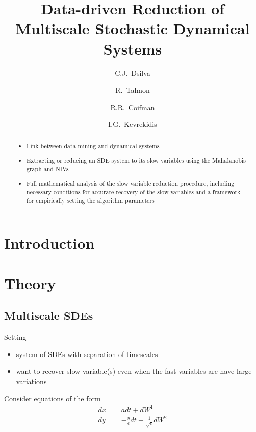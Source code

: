 \documentclass[1p]{elsarticle}
\title{Data-driven Reduction of Multiscale Stochastic Dynamical Systems }
\author[PrincetonCBE]{C.J.~Dsilva}
\author[YaleMath]{R.~Talmon}
\author[YaleMath]{R.R.~Coifman}
\author[PrincetonCBE, PrincetonPACM]{I.G.~Kevrekidis\corref{cor1}}
\begin{document}
\begin{abstract}

\begin{itemize}

\item Link between data mining and dynamical systems

\item Extracting or reducing an SDE system to its slow variables using the Mahalanobis graph and NIVs

\item Full mathematical analysis of the slow variable reduction procedure, including necessary conditions for accurate recovery of the slow variables and a framework for empirically setting the algorithm parameters

\end{itemize}

\end{abstract}


\begin{keyword}
 
\end{keyword}

\maketitle

\section{Introduction}

\section{Theory}

\subsection{Multiscale SDEs}

Setting
\begin{itemize}
\item system of SDEs with separation of timescales
\item want to recover slow variable(s) even when the fast variables are have large variations
\end{itemize}


Consider equations of the form
\begin{equation} \label{eq:fast_slow_SDE}
\begin{aligned}
dx &= adt + dW^1\\
dy &= -\frac{y}{\epsilon} dt + \frac{1}{\sqrt{\epsilon}} dW^2
\end{aligned}
\end{equation}
\end{document}

